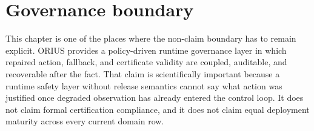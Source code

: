 \section{Governance boundary}
This chapter is one of the places where the non-claim boundary has to remain explicit. ORIUS
provides a policy-driven runtime governance layer in which repaired action, fallback, and
certificate validity are coupled, auditable, and recoverable after the fact. That claim is
scientifically important because a runtime safety layer without release semantics cannot say
what action was justified once degraded observation has already entered the control loop. It
does not claim formal certification compliance, and it does not claim equal deployment
maturity across every current domain row.
